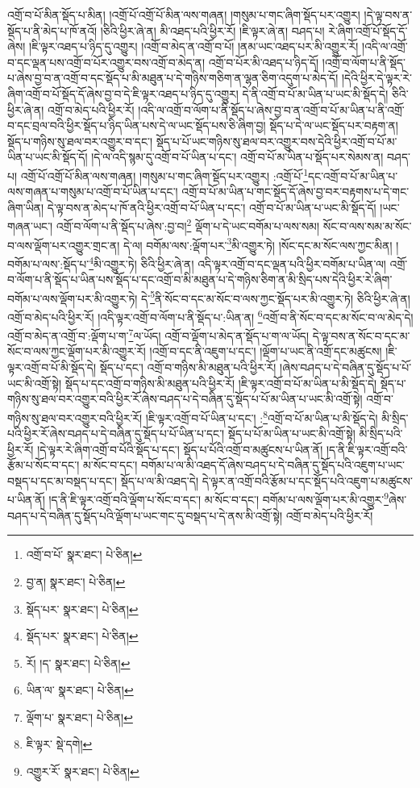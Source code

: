 འགྲོ་བ་པོ་མིན་སྡོད་པ་མིན། །འགྲོ་པོ་འགྲོ་པོ་མིན་ལས་གཞན། །གསུམ་པ་གང་ཞིག་སྡོད་པར་འགྱུར། །དེ་ལྟ་བས་ན་སྡོད་པ་ནི་མེད་པ་ཁོ་ནའོ། །ཅིའི་ཕྱིར་ཞེ་ན། མི་འཐད་པའི་ཕྱིར་རོ། །ཇི་ལྟར་ཞེ་ན། བཤད་པ། རེ་ཞིག་འགྲོ་པོ་སྡོད་དོ་ཞེས། །ཇི་ལྟར་འཐད་པ་ཉིད་དུ་འགྱུར། །འགྲོ་བ་མེད་ན་འགྲོ་བ་པོ། །ནམ་ཡང་འཐད་པར་མི་འགྱུར་རོ། །འདི་ལ་འགྲོ་བ་དང་ལྡན་པས་འགྲོ་བ་པོར་འགྱུར་བས་འགྲོ་བ་མེད་ན། འགྲོ་བ་པོར་མི་འཐད་པ་ཉིད་དོ། །འགྲོ་བ་ལོག་པ་ནི་སྡོད་པ་ཞེས་བྱ་བ་ན་འགྲོ་བ་དང་སྡོད་པ་མི་མཐུན་པ་དེ་གཉིས་གཅིག་ན་ལྷན་ཅིག་འདུག་པ་མེད་དོ། །དེའི་ཕྱིར་དེ་ལྟར་རེ་ཞིག་འགྲོ་བ་པོ་སྡོད་དོ་ཞེས་བྱ་བ་དེ་ཇི་ལྟར་འཐད་པ་ཉིད་དུ་འགྱུར། དེ་ནི་འགྲོ་བ་པོ་མ་ཡིན་པ་ཡང་མི་སྡོད་དེ། ཅིའི་ཕྱིར་ཞེ་ན། འགྲོ་བ་མེད་པའི་ཕྱིར་རོ། །འདི་ལ་འགྲོ་བ་ལོག་པ་ནི་སྡོད་པ་ཞེས་བྱ་བ་ན་འགྲོ་བ་པོ་མ་ཡིན་པ་ནི་འགྲོ་བ་དང་བྲལ་བའི་ཕྱིར་སྡོད་པ་ཉིད་ཡིན་པས་དེ་ལ་ཡང་སྡོད་པས་ཅི་ཞིག་བྱ། སྡོད་པ་དེ་ལ་ཡང་སྡོད་པར་བརྟག་ན། སྡོད་པ་གཉིས་སུ་ཐལ་བར་འགྱུར་བ་དང་། སྡོད་པ་པོ་ཡང་གཉིས་སུ་ཐལ་བར་འགྱུར་བས་དེའི་ཕྱིར་འགྲོ་བ་པོ་མ་ཡིན་པ་ཡང་མི་སྡོད་དོ། །དེ་ལ་འདི་སྙམ་དུ་འགྲོ་བ་པོ་ཡིན་པ་དང་། འགྲོ་བ་པོ་མ་ཡིན་པ་སྡོད་པར་སེམས་ན། བཤད་པ། འགྲོ་པོ་འགྲོ་པོ་མིན་ལས་གཞན། །གསུམ་པ་གང་ཞིག་སྡོད་པར་འགྱུར། :འགྲོ་པོ་\footnote{འགྲོ་བ་པོ་  སྣར་ཐང་།  པེ་ཅིན། }དང་འགྲོ་བ་པོ་མ་ཡིན་པ་ལས་གཞན་པ་གསུམ་པ་འགྲོ་བ་པོ་ཡིན་པ་དང་། འགྲོ་བ་པོ་མ་ཡིན་པ་གང་སྡོད་དོ་ཞེས་བྱ་བར་བརྟགས་པ་དེ་གང་ཞིག་ཡིན། དེ་ལྟ་བས་ན་མེད་པ་ཁོ་ནའི་ཕྱིར་འགྲོ་བ་པོ་ཡིན་པ་དང་། འགྲོ་བ་པོ་མ་ཡིན་པ་ཡང་མི་སྡོད་དོ། །ཡང་གཞན་ཡང་། འགྲོ་བ་ལོག་པ་ནི་སྡོད་པ་ཞེས་:བྱ་བ།\footnote{བྱ་ན།  སྣར་ཐང་།  པེ་ཅིན། } ལྡོག་པ་དེ་ཡང་བགོམ་པ་ལས་སམ། སོང་བ་ལས་སམ་མ་སོང་བ་ལས་ལྡོག་པར་འགྱུར་གྲང་ན། དེ་ལ། བགོམ་ལས་:ལྡོག་པར་\footnote{སྡོད་པར་  སྣར་ཐང་།  པེ་ཅིན། }མི་འགྱུར་ཏེ། །སོང་དང་མ་སོང་ལས་ཀྱང་མིན། །བགོམ་པ་ལས་:སྡོད་པ་\footnote{སྡོད་པར་  སྣར་ཐང་།  པེ་ཅིན། }མི་འགྱུར་ཏེ། ཅིའི་ཕྱིར་ཞེ་ན། འདི་ལྟར་འགྲོ་བ་དང་ལྡན་པའི་ཕྱིར་བགོམ་པ་ཡིན་ལ། འགྲོ་བ་ལོག་པ་ནི་སྡོད་པ་ཡིན་པས་སྡོད་པ་དང་འགྲོ་བ་མི་མཐུན་པ་དེ་གཉིས་ཅིག་ན་མི་སྲིད་པས་དེའི་ཕྱིར་རེ་ཞིག་བགོམ་པ་ལས་ལྡོག་པར་མི་འགྱུར་ཏེ། དེ་\footnote{རོ། །ད་  སྣར་ཐང་།  པེ་ཅིན། }ནི་སོང་བ་དང་མ་སོང་བ་ལས་ཀྱང་སྡོད་པར་མི་འགྱུར་ཏེ། ཅིའི་ཕྱིར་ཞེ་ན། འགྲོ་བ་མེད་པའི་ཕྱིར་རོ། །འདི་ལྟར་འགྲོ་བ་ལོག་པ་ནི་སྡོད་པ་:ཡིན་ན། \footnote{ཡིན་ལ་  སྣར་ཐང་།  པེ་ཅིན། }འགྲོ་བ་ནི་སོང་བ་དང་མ་སོང་བ་ལ་མེད་དེ། འགྲོ་བ་མེད་ན་འགྲོ་བ་:ལྡོག་པ་ག་\footnote{ལྡོག་པ་  སྣར་ཐང་།  པེ་ཅིན། }ལ་ཡོད། འགྲོ་བ་ལྡོག་པ་མེད་ན་སྡོད་པ་ག་ལ་ཡོད། དེ་ལྟ་བས་ན་སོང་བ་དང་མ་སོང་བ་ལས་ཀྱང་ལྡོག་པར་མི་འགྱུར་རོ། །འགྲོ་བ་དང་ནི་འཇུག་པ་དང་། །ལྡོག་པ་ཡང་ནི་འགྲོ་དང་མཚུངས། །ཇི་ལྟར་འགྲོ་བ་པོ་མི་སྡོད་དེ། སྡོད་པ་དང་། འགྲོ་བ་གཉིས་མི་མཐུན་པའི་ཕྱིར་རོ། །ཞེས་བཤད་པ་དེ་བཞིན་དུ་སྡོད་པ་པོ་ཡང་མི་འགྲོ་སྟེ། སྡོད་པ་དང་འགྲོ་བ་གཉིས་མི་མཐུན་པའི་ཕྱིར་རོ། །ཇི་ལྟར་འགྲོ་བ་པོ་མ་ཡིན་པ་མི་སྡོད་དེ། སྡོད་པ་གཉིས་སུ་ཐལ་བར་འགྱུར་བའི་ཕྱིར་རོ་ཞེས་བཤད་པ་དེ་བཞིན་དུ་སྡོད་པ་པོ་མ་ཡིན་པ་ཡང་མི་འགྲོ་སྟེ། འགྲོ་བ་གཉིས་སུ་ཐལ་བར་འགྱུར་བའི་ཕྱིར་རོ། །ཇི་ལྟར་འགྲོ་བ་པོ་ཡིན་པ་དང་། :\footnote{ཇི་ལྟར་  སྡེ་དགེ། }འགྲོ་བ་པོ་མ་ཡིན་པ་མི་སྡོད་དེ། མི་སྲིད་པའི་ཕྱིར་རོ་ཞེས་བཤད་པ་དེ་བཞིན་དུ་སྡོད་པ་པོ་ཡིན་པ་དང་། སྡོད་པ་པོ་མ་ཡིན་པ་ཡང་མི་འགྲོ་སྟེ། མི་སྲིད་པའི་ཕྱིར་རོ། །དེ་ལྟར་རེ་ཞིག་འགྲོ་བ་པོའི་སྡོད་པ་དང་། སྡོད་པ་པོའི་འགྲོ་བ་མཚུངས་པ་ཡིན་ནོ། །ད་ནི་ཇི་ལྟར་འགྲོ་བའི་རྩོམ་པ་སོང་བ་དང་། མ་སོང་བ་དང་། བགོམ་པ་ལ་མི་འཐད་དོ་ཞེས་བཤད་པ་དེ་བཞིན་དུ་སྡོད་པའི་འཇུག་པ་ཡང་བསྡད་པ་དང་མ་བསྡད་པ་དང་། སྡོད་པ་ལ་མི་འཐད་དེ། དེ་ལྟར་ན་འགྲོ་བའི་རྩོམ་པ་དང་སྡོད་པའི་འཇུག་པ་མཚུངས་པ་ཡིན་ནོ། །ད་ནི་ཇི་ལྟར་འགྲོ་བའི་ལྡོག་པ་སོང་བ་དང་། མ་སོང་བ་དང་། བགོམ་པ་ལས་ལྡོག་པར་མི་འགྱུར་\footnote{འགྱུར་རོ་  སྣར་ཐང་།  པེ་ཅིན། }ཞེས་བཤད་པ་དེ་བཞིན་དུ་སྡོད་པའི་ལྡོག་པ་ཡང་གང་དུ་བསྡད་པ་དེ་ནས་མི་འགྲོ་སྟེ། འགྲོ་བ་མེད་པའི་ཕྱིར་རོ། 